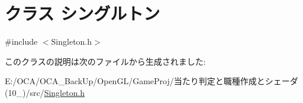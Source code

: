 \hypertarget{class_xE3_x82_xB7_xE3_x83_xB3_xE3_x82_xB0_xE3_x83_xAB_xE3_x83_x88_xE3_x83_xB3}{\section{クラス シングルトン}
\label{class_xE3_x82_xB7_xE3_x83_xB3_xE3_x82_xB0_xE3_x83_xAB_xE3_x83_x88_xE3_x83_xB3}
}


{\ttfamily \#include $<$Singleton.\-h$>$}



このクラスの説明は次のファイルから生成されました\-:\begin{DoxyCompactItemize}
\item 
E\-:/\-O\-C\-A/\-O\-C\-A\-\_\-\-Back\-Up/\-Open\-G\-L/\-Game\-Proj/当たり判定と職種作成とシェーダ(10\-\_)/src/\hyperlink{_singleton_8h}{Singleton.\-h}\end{DoxyCompactItemize}
